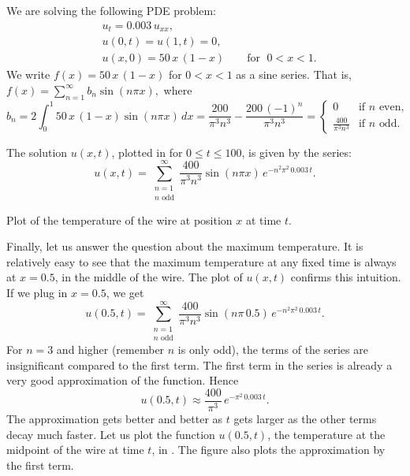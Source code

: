 \begin{exampleSol}
We are solving the following PDE problem:
\begin{align*}
& u_t = 0.003 \, u_{xx} , \\
& u(0,t) = u(1,t) = 0 , \\
& u(x,0) = 50\,x\,(1-x) \qquad \text{for } \; 0 < x < 1 .
\end{align*}
We write $f(x) = 50\,x\,(1-x)$ for $0 < x < 1$ as a sine series.  That is,
$
f(x) = \sum_{n=1}^\infty b_n \sin (n \pi x) ,
$
where
\begin{equation*}
b_n = 2 \int_0^1 50\,x\,(1-x) \sin (n \pi x) \,dx
= 
\frac{200}{{\pi }^{3}{n}^{3}}-\frac{200\,{\left( -1\right) }^{n}}{{\pi }^{3}{n}^{3}}
=
\begin{cases}
0 & \text{if } n \text{ even} , \\
\frac{400}{\pi^3 n^3} & \text{if } n \text{ odd} .
\end{cases}
\end{equation*}

The solution $u(x,t)$, plotted in
 for $0 \leq t \leq 100$,
is given by the series:
\begin{equation*}
u(x,t) = 
\sum_{\substack{n=1 \\ n \text{ odd}}}^\infty
\frac{400}{\pi^3 n^3}
\sin (n \pi x )
\, e^{-n^2 \pi^2 \, 0.003 \, t} .
\end{equation*}

\begin{myfig}
\capstart
{}
\caption{Plot of the temperature of the wire at position $x$
at time $t$.\label{heat:wireexfig}}
\end{myfig}

Finally, let us answer the question about the maximum temperature.  It is
relatively easy to see
that the maximum temperature at any fixed time is always at $x=0.5$, in
the middle of the wire.  The plot of $u(x,t)$ confirms this intuition.
If we plug in $x=0.5$, we get
\begin{equation*}
u(0.5,t) = 
\sum_{\substack{n=1 \\ n \text{ odd}}}^\infty
\frac{400}{\pi^3 n^3}
\sin (n \pi\, 0.5 )
\, e^{-n^2 \pi^2 \, 0.003 \, t} .
\end{equation*}
For $n=3$ and higher (remember $n$ is only odd), the terms
of the series
are insignificant compared to the first term.
The first term in the series is already a very good approximation
of the function.  
Hence 
\begin{equation*}
u(0.5,t) \approx
\frac{400}{\pi^3}
\, e^{-\pi^2 \, 0.003 \, t} .
\end{equation*}
The approximation gets better and better as $t$ gets larger as the other
terms decay much faster.
Let us plot the function $u(0.5,t)$, the temperature at the midpoint of the wire
at time $t$, in .  The figure also
plots the approximation by the first term.


\end{exampleSol}
